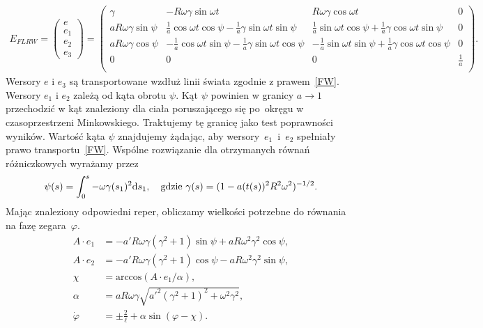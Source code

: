 \begin{align}\nonumber
E_{FLRW} = 
\begin{pmatrix}
e\\
e_1\\
e_2\\
e_3
\end{pmatrix}
=
\begin{pmatrix}
\gamma 	& -R\omega\gamma\sin\omega t 	
& R\omega\gamma\cos\omega t & 0 \\
a R\omega\gamma \sin \psi	
& \frac{1}{a} \cos\omega t \cos\psi - \frac{1}{a}\gamma \sin\omega t \sin\psi
& \frac{1}{a} \sin\omega t \cos\psi + \frac{1}{a}\gamma \cos\omega t \sin\psi
& 0 \\
a R\omega\gamma \cos \psi & -\frac{1}{a} \cos\omega t \sin\psi - 
\frac{1}{a}\gamma \sin\omega t \cos\psi
& -\frac{1}{a} \sin\omega t \sin\psi + 
\frac{1}{a}\gamma \cos\omega t \cos\psi		 & 0 \\
0&	0	& 0	& \frac{1}{a} \\
\end{pmatrix}.
\end{align}
Wersory $e$ i $e_3$ są transportowane wzdłuż linii świata 
zgodnie z prawem~\eqref{FW}. Wersory $e_1$ i $e_2$ 
zależą od kąta obrotu $\psi$. Kąt $\psi$ powinien w granicy $a\to 1$ 
przechodzić w kąt znaleziony 
dla ciała poruszającego się po~okręgu w czasoprzestrzeni Minkowskiego.
Traktujemy tę granicę jako test poprawności wyników. 
Wartość kąta $\psi$ znajdujemy 
żądając, aby wersory~$e_1$~i~$e_2$ spełniały prawo transportu~\eqref{FW}. 
Wspólne rozwiązanie dla otrzymanych równań różniczkowych 
wyrażamy przez
\begin{align}\nonumber
\psi(s) =\int_0^s -\omega \gamma(s_1)^2  \text{d} s_1 , \quad 
\text{gdzie } \gamma(s) = (1-a(t(s))^2R^2\omega^2)^{-1/2}.
\end{align}
Mając znaleziony odpowiedni reper, obliczamy wielkości
potrzebne do równania na fazę zegara~$\varphi$.
\begin{align*}\nonumber
A\cdot e_1 &= -a'R\omega \gamma \left( \gamma^2+1 \right)\sin\psi
 + a R \omega^2\gamma^2\cos\psi ,       \\
A\cdot e_2 &= -a'R\omega \gamma \left( \gamma^2+1 \right)\cos\psi
 - a R \omega^2 \gamma^2 \sin \psi  ,     \nonumber  \\
\chi & = \text{arccos} \left( A\cdot e_1 / \alpha \right) ,
\\
\alpha & = 
a R \omega \gamma \sqrt{a'^2 \left(\gamma ^2+1\right)^2
 +   \omega^2\gamma^2} ,
\\
\dot{\varphi} &= \pm \frac{2}{\ell} + \alpha \sin (\varphi - \chi) .
\end{align*}
